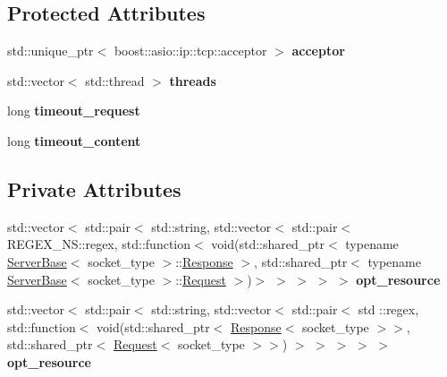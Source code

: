 \subsection*{Protected Attributes}
\begin{DoxyCompactItemize}
\item 
\mbox{\label{classhttp_1_1_server_base_a7585af4bf75049f0118958736eb28395}} 
std\+::unique\+\_\+ptr$<$ boost\+::asio\+::ip\+::tcp\+::acceptor $>$ {\bfseries acceptor}
\item 
\mbox{\label{classhttp_1_1_server_base_aa7913c14bf3a3deb5047db61c300f149}} 
std\+::vector$<$ std\+::thread $>$ {\bfseries threads}
\item 
\mbox{\label{classhttp_1_1_server_base_aea137d71c0f9f31e7c5cc47e0932c22b}} 
long {\bfseries timeout\+\_\+request}
\item 
\mbox{\label{classhttp_1_1_server_base_aabaf31180e0ef8b124281a3a28780d25}} 
long {\bfseries timeout\+\_\+content}
\end{DoxyCompactItemize}
\subsection*{Private Attributes}
\begin{DoxyCompactItemize}
\item 
\mbox{\label{classhttp_1_1_server_base_ab3bd30db0791c2286f67dcb8365c1cb3}} 
std\+::vector$<$ std\+::pair$<$ std\+::string, std\+::vector$<$ std\+::pair$<$ R\+E\+G\+E\+X\+\_\+\+N\+S\+::regex, std\+::function$<$ void(std\+::shared\+\_\+ptr$<$ typename \hyperlink{classhttp_1_1_server_base}{Server\+Base}$<$ socket\+\_\+type $>$\+::\hyperlink{classhttp_1_1_server_base_1_1_response}{Response} $>$, std\+::shared\+\_\+ptr$<$ typename \hyperlink{classhttp_1_1_server_base}{Server\+Base}$<$ socket\+\_\+type $>$\+::\hyperlink{classhttp_1_1_server_base_1_1_request}{Request} $>$)$>$ $>$ $>$ $>$ $>$ {\bfseries opt\+\_\+resource}
\item 
\mbox{\label{classhttp_1_1_server_base_a518f7995bd211ab69afa7fb8bd3d8c28}} 
std\+::vector$<$ std\+::pair$<$ std\+::string, std\+::vector$<$ std\+::pair$<$ std \+::regex, std\+::function$<$ void(std\+::shared\+\_\+ptr$<$ \hyperlink{classhttp_1_1_server_base_1_1_response}{Response}$<$ socket\+\_\+type $>$$>$, std\+::shared\+\_\+ptr$<$ \hyperlink{classhttp_1_1_server_base_1_1_request}{Request}$<$ socket\+\_\+type $>$$>$) $>$ $>$ $>$ $>$ $>$ {\bfseries opt\+\_\+resource}
\end{DoxyCompactItemize}


